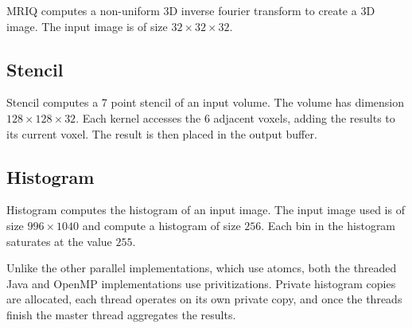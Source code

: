 MRIQ computes a non-uniform 3D inverse fourier transform to create a 3D image.
The input image is of size $32 \times 32 \times 32$.

\subsection{Stencil}

Stencil computes a 7 point stencil of an input volume. 
The volume has dimension $128 \times 128 \times 32$.
Each kernel accesses the $6$ adjacent voxels, adding the results
	to its current voxel.
The result is then placed in the output buffer.

\subsection{Histogram}

Histogram computes the histogram of an input image.
The input image used is of size $996 \times 1040$ and compute a 
	histogram of size $256$.
Each bin in the histogram saturates at the value $255$.

Unlike the other parallel implementations, which use atomcs, both the
	threaded Java and OpenMP implementations use privitizations.
Private histogram copies are allocated, each thread 
	operates on its own private copy, and once the threads finish the
	master thread aggregates the results.

